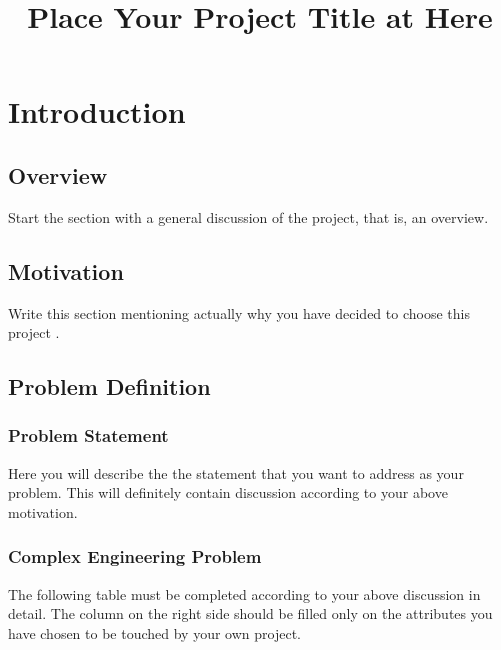 \documentclass[12pt]{report}
\title{Place Your Project Title at Here}
\begin{document}
    
    \tableofcontents
  


\newpage
\chapter{Introduction}

\section{Overview}
Start the section with a general discussion of the project, that is, an overview.

\section{Motivation}
Write this section mentioning actually why you have decided to choose this project \cite{farokhzad2009impact}.

\section{Problem Definition}

\subsection{Problem Statement}
Here you will describe the the statement that you want to address as your problem. This will definitely contain discussion according to your above motivation.

\subsection{Complex Engineering Problem}
The following table must be completed according to your above discussion in detail. The column on the right side should be filled only on the attributes you have chosen to be touched by your own project.
\end{document}

